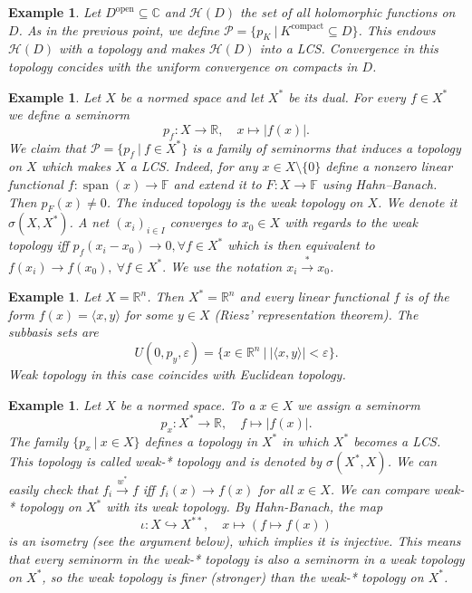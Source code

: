 \documentclass[10pt, a4paper]{article}
\newtheorem{example}[thm]{Example}
\newcommand{\R}{\mathbb {R}}
\newcommand{\C}{\mathbb {C}}
\newcommand{\F}{\mathbb {F}}
\DeclareMathOperator{\linspan}{span}
\begin{document}
\begin{example}
        Let $D^{\textrm{open}} \subseteq \C$ and $\mathcal{H} (D)$ the set of all holomorphic functions on $D$.
        As in the previous point, we define $\mathcal{P} = \{p_K\ |\ K^{\textrm{compact}} \subseteq D\}$.
        This endows $\mathcal{H}(D)$ with a topology and makes $\mathcal{H}(D)$ into a LCS.
        Convergence in this topology concides with the uniform convergence on compacts in $D$.            
\end{example} 
        
\begin{example}
    Let $X$ be a normed space and let $X^*$ be its dual. For every $f \in X^*$ we define a seminorm 
        $$p_f: X \to \R,\quad x \mapsto |f(x)|.$$
        We claim that $\mathcal{P} = \{p_f\ |\ f \in X^*\}$ is a family of seminorms that induces a topology on $X$ which makes $X$ a LCS.  
        Indeed, for any $x \in X \setminus \{0\}$ define a nonzero linear functional $f: \linspan (x) \to \F$ and extend it to $F: X \to \F$ using Hahn--Banach.
        Then $p_F (x) \neq 0$.
        The induced topology is the weak topology on $X$. We denote it $\sigma(X, X^*)$. A net $(x_i)_{i \in I}$ converges to $x_0 \in X$ with regards to the weak topology
        iff $p_f (x_i - x_0) \to 0,\forall f \in X^*$ which is then equivalent to $f(x_i) \to f(x_0),\ \forall f \in X^*.$
        We use the notation $x_i \xrightarrow{*} x_0$.
\end{example}

\begin{example}
  Let $X = \R^n$. Then $X^* = \R^n$ and every linear functional $f$ is of the form 
  $f(x) = \langle x, y \rangle$ for some $y \in X$ (Riesz' representation theorem). The subbasis sets are
  $$U(0, p_y, \varepsilon) = \{x \in \R^n\ |\ |\langle x, y\rangle| < \varepsilon\}.$$
  Weak topology in this case coincides with Euclidean topology.
\end{example} 

\begin{example}
    Let $X$ be a normed space. To a $x \in X$ we assign a seminorm $$p_x: X^* \to \R,\quad f \mapsto |f(x)|.$$
    The family $\{p_x\ |\ x \in X\}$ defines a topology in $X^*$ in which $X^*$ becomes a LCS.
    This topology is called weak-* topology and is denoted by $\sigma (X^*, X)$.
    We can easily check that $f_i \xrightarrow{w^*} f$ iff $f_i (x) \to f(x)$ for all $x \in X$.
    We can compare weak-* topology on $X^*$ with its weak topology.
    By Hahn-Banach, the map $$\iota: X \hookrightarrow X^{**},\quad x \mapsto (f \mapsto f(x))$$
    is an isometry (see the argument below), which implies it is injective. This means that every seminorm in the weak-* topology is also 
    a seminorm in a weak topology on $X^*$, so the weak topology is finer (stronger) than the weak-* topology on $X^*$.
\end{example}
\end{document}
